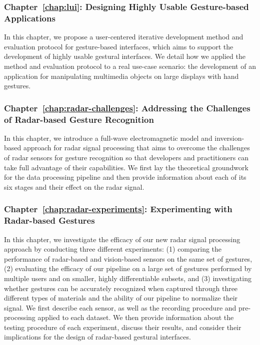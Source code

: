 \subsubsection{Chapter~\ref{chap:lui}: Designing Highly Usable Gesture-based Applications} 
In this chapter, we propose a user-centered iterative development method and evaluation protocol for gesture-based interfaces, which aims to support the development of highly usable gestural interfaces.
%
We detail how we applied the method and evaluation protocol to a real use-case scenario: the development of an application for manipulating multimedia objects on large displays with hand gestures. 

\subsubsection{Chapter~\ref{chap:radar-challenges}: Addressing the Challenges of Radar-based Gesture Recognition} 
In this chapter, we introduce a full-wave electromagnetic model and inversion-based approach for radar signal processing that aims to overcome the challenges of radar sensors for gesture recognition so that developers and practitioners can take full advantage of their capabilities.
%
We first lay the theoretical groundwork for the data processing pipeline and then provide information about each of its six stages and their effect on the radar signal.

\subsubsection{Chapter~\ref{chap:radar-experiments}: Experimenting with Radar-based Gestures}
In this chapter, we investigate the efficacy of our new radar signal processing approach by conducting three different experiments: (1) comparing the performance of radar-based and vision-based sensors on the same set of gestures, (2) evaluating the efficacy of our pipeline on a large set of gestures performed by multiple users and on smaller, highly differentiable subsets, and (3) investigating whether gestures can be accurately recognized when captured through three different types of materials and the ability of our pipeline to normalize their signal.
%
We first describe each sensor, as well as the recording procedure and pre-processing applied to each dataset. 
%
We then provide information about the testing procedure of each experiment, discuss their results, and consider their implications for the design of radar-based gestural interfaces.

